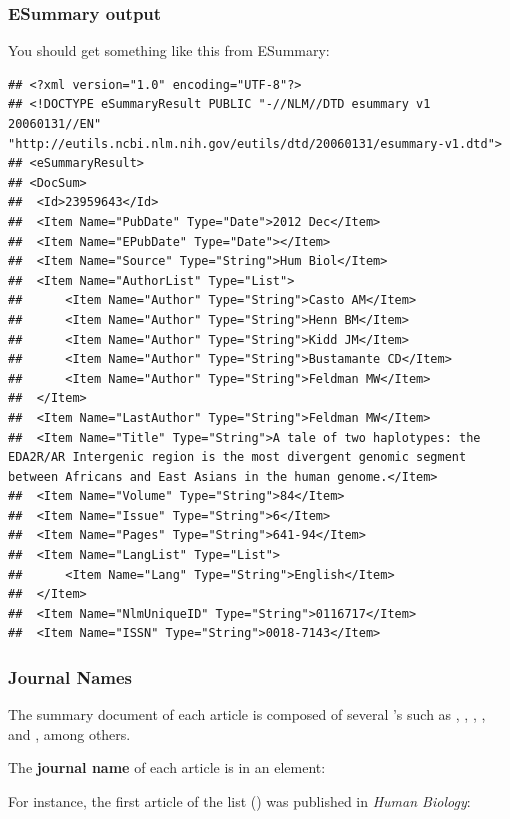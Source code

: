 \documentclass{beamer}\usepackage[]{graphicx}\usepackage[]{color}
\makeatletter
\newenvironment{kframe}{%
 \def\at@end@of@kframe{}%
 \ifinner\ifhmode%
  \def\at@end@of@kframe{\end{minipage}}%
  \begin{minipage}{\columnwidth}%
 \fi\fi%
 \def\FrameCommand##1{\hskip\@totalleftmargin \hskip-\fboxsep
 \colorbox{shadecolor}{##1}\hskip-\fboxsep
     \hskip-\linewidth \hskip-\@totalleftmargin \hskip\columnwidth}%
 \MakeFramed {\advance\hsize-\width
   \@totalleftmargin\z@ \linewidth\hsize
   \@setminipage}}%
 {\par\unskip\endMakeFramed%
 \at@end@of@kframe}
\newenvironment{knitrout}{}{} %
\makeatother
\begin{document}

\begin{frame}[fragile]
\frametitle{ESummary output}

You should get something like this from ESummary:

\begin{knitrout}\tiny
{}\color{fgcolor}\begin{kframe}
\begin{verbatim}
## <?xml version="1.0" encoding="UTF-8"?> 
## <!DOCTYPE eSummaryResult PUBLIC "-//NLM//DTD esummary v1 20060131//EN" "http://eutils.ncbi.nlm.nih.gov/eutils/dtd/20060131/esummary-v1.dtd"> 
## <eSummaryResult> 
## <DocSum> 
## 	<Id>23959643</Id> 
## 	<Item Name="PubDate" Type="Date">2012 Dec</Item> 
## 	<Item Name="EPubDate" Type="Date"></Item> 
## 	<Item Name="Source" Type="String">Hum Biol</Item> 
## 	<Item Name="AuthorList" Type="List"> 
## 		<Item Name="Author" Type="String">Casto AM</Item> 
## 		<Item Name="Author" Type="String">Henn BM</Item> 
## 		<Item Name="Author" Type="String">Kidd JM</Item> 
## 		<Item Name="Author" Type="String">Bustamante CD</Item> 
## 		<Item Name="Author" Type="String">Feldman MW</Item> 
## 	</Item> 
## 	<Item Name="LastAuthor" Type="String">Feldman MW</Item> 
## 	<Item Name="Title" Type="String">A tale of two haplotypes: the EDA2R/AR Intergenic region is the most divergent genomic segment between Africans and East Asians in the human genome.</Item> 
## 	<Item Name="Volume" Type="String">84</Item> 
## 	<Item Name="Issue" Type="String">6</Item> 
## 	<Item Name="Pages" Type="String">641-94</Item> 
## 	<Item Name="LangList" Type="List"> 
## 		<Item Name="Lang" Type="String">English</Item> 
## 	</Item> 
## 	<Item Name="NlmUniqueID" Type="String">0116717</Item> 
## 	<Item Name="ISSN" Type="String">0018-7143</Item>
\end{verbatim}
\end{kframe}
\end{knitrout}

\end{frame}


\begin{frame}
\frametitle{Journal Names}

The summary document of each  article is composed of several 's such as , , , , and , among others. 

\bigskip
The \textbf{journal name} of each article is in an element: \\

\bigskip
For instance, the first article of the list () was published in \textit{Human Biology}: \\ 

\end{frame}
\end{document}

